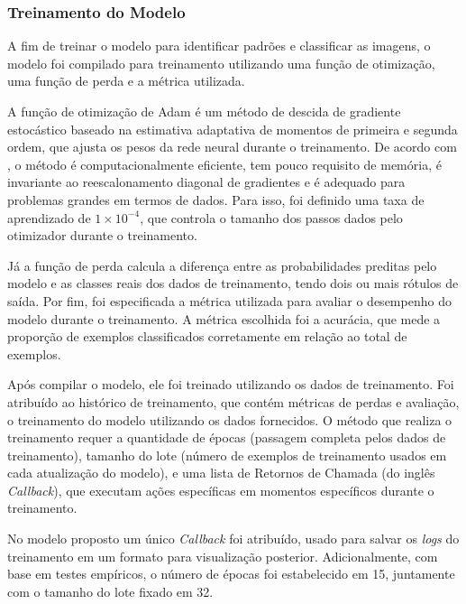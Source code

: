 
\subsubsection{\esp Treinamento do Modelo} \label{treinamento}

A fim de treinar o modelo para identificar padrões e classificar as imagens, o modelo foi compilado para treinamento utilizando uma função de otimização, uma função de perda e a métrica utilizada. 

A função de otimização de Adam é um método de descida de gradiente estocástico baseado na estimativa adaptativa de momentos de primeira e segunda ordem, que ajusta os pesos da rede neural durante o treinamento. De acordo com , o método é computacionalmente eficiente, tem pouco requisito de memória, é invariante ao reescalonamento diagonal de gradientes e é adequado para problemas grandes em termos de dados. Para isso, foi definido uma taxa de aprendizado de \ensuremath{1 \times 10^{-4}}, que controla o tamanho dos passos dados pelo otimizador durante o treinamento. 

Já a função de perda calcula a diferença entre as probabilidades preditas pelo modelo e as classes reais dos dados de treinamento, tendo dois ou mais rótulos de saída. Por fim, foi especificada a métrica utilizada para avaliar o desempenho do modelo durante o treinamento. A métrica escolhida foi a acurácia, que mede a proporção de exemplos classificados corretamente em relação ao total de exemplos. 

Após compilar o modelo, ele foi treinado utilizando os dados de treinamento. Foi atribuído ao histórico de treinamento, que contém métricas de perdas e avaliação, o treinamento do modelo utilizando os dados fornecidos. O método que realiza o treinamento requer a quantidade de épocas (passagem completa pelos dados de treinamento), tamanho do lote (número de exemplos de treinamento usados em cada atualização do modelo), e uma lista de Retornos de Chamada (do inglês \textit{Callback}), que executam ações específicas em momentos específicos durante o treinamento. 

No modelo proposto um único \textit{Callback} foi atribuído, usado para salvar os \textit{logs} do treinamento em um formato para visualização posterior. Adicionalmente, com base em testes empíricos, o número de épocas foi estabelecido em 15, juntamente com o tamanho do lote fixado em 32.


